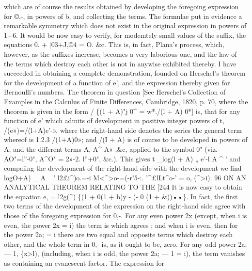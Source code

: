 \documentclass[11pt,a4paper]{book}
\begin{document}
which  are  of  course  the  results  obtained  by  developing  the  foregoing  expression  for
©,-,  in  powers  of  b,  and  collecting  the  terms.  The  formulae  put  in  evidence  a  remarkable
symmetry  which  does  not  exist  in  the  original  expression  in  powers  of  1+6.
It  would  be  now  easy  to  verify,  for  modemtely  small  values  of  the  suffix,  the
equations
0.  +  |03+J,©4  =  O.
\&c.
This  is,  in  fact,  Plana's  process,  which,  however,  as  the  suffixes  increase,  becomes  a
very  laborious  one,  and  the  law  of  the  terms  which  destroy  each  other  is  not  in
anywise  exhibited   thereby.
I  have  succeeded  in  obtaining  a  complete  demonstration,  founded  on  Herschel's
theorem  for  the  development  of  a  function  of  e',  and  the  expression  thereby  given  for
Bernoulli's  numbers.  The  theorem  in  question  [See  Herschel's  Collection  of  Examples
in  the  Calculus  of  Finite  Differences,  Cambridge,  1820,  p.  70,  where  the  theorem  is
given  in  the  form  /  \{(1  +  A)"j  0^  =  w*./(l  +  A)  0*]  is,  that  for  any  function  of  e'  which
admits  of  development  in  positive  integer  powers  of  t,
/(e«)=/(l+A)e'-»,
where  the  right-hand  side  denotes  the  series  the  general  term  whereof  is
1.2.3
/(1+A)0»;
and  /(I  +  A)   is   of   course   to   be   developed  in   powers   of    A,   and   the   different   terms
A,  A^  A»  ,\&c,  applied    to    the   symbol   0"  (viz.    AO"=l''-0",    A^O"  =  2»-2.  l''+0",  \&c.).
This  gives
t     _log(l  +  A)     „
e'-l  A        ^  '
and  compaiing  the  development  of  the  right-hand  side  with  the  development
we  find
logO+A)       _
A  ~    '
l2£i^)o.=-i
M<^>o-=(-r'5-:.
'^£lLt^o-'  =  o,  (^>i).
96  ON   AN    ANALYTICAL   THEOREM   RELATING   TO   THE  [244
It  is  now  easy  to  obtain  the   equation
e, = l2g(^)  \{(1  +  0(1  +  b)y  -  (-  0  (1 + \&))••\}.
In  fact,  the  first  two  terms  of  the  development  of  the  expression  on  the  right-hand
side  agree  with  those  of  the  foregoing  expression  for  0,-.  For  any  even  power  2x
(except,  when  i  is  even,  the  power  2x  =  i)  the  term  is
which  agrees ;  and  when  i  is  even,  then  for  the  power  2a;  =  i  there  are  two  equal  and
opposite  terms  which  destroy  each  other,  and  the  whole  term  in  0,-  is,  as  it  ought  to
be,  zero.  For  any  odd  power  2a;  — 1,  \{x>l),  (including,  when  i  is  odd,  the  power
2a;  —  1  =  i),  the  term  vanishes  as  containing  an  evanescent  factor.  The  expression  for
\end{document}
